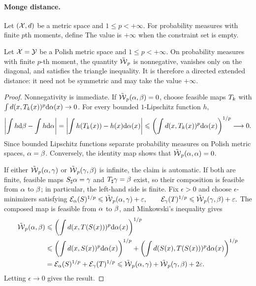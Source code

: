 \paragraph{Monge distance.}
\begin{defn}\label{def-directed-monge-distance}
Let $(\mathcal{X},d)$ be a metric space and $1\leq p<+\infty$. For probability measures with finite $p$th moments, define
The value is $+\infty$ when the constraint set is empty.
\end{defn}
\begin{prop}\label{prop-directed-monge-distance}
Let $\mathcal{X}=\mathcal{Y}$ be a Polish metric space and $1\leq p<+\infty$. On probability measures with finite $p$-th moment, the quantity $\tilde{\operatorname{\mathcal{W}}}_p$ is nonnegative, vanishes only on the diagonal, and satisfies the triangle inequality. It is therefore a directed extended distance: it need not be symmetric and may take the value $+\infty$.
\end{prop}
\begin{proof}
Nonnegativity is immediate. If $\tilde{\operatorname{\mathcal{W}}}_p(\alpha,\beta)=0$, choose feasible maps $T_k$ with $\int d(x,T_k(x))^p\mathrm{d}\alpha(x)\to0$. For every bounded $1$-Lipschitz function $h$,
\[
\left|\int h\mathrm{d}\beta-\int h\mathrm{d}\alpha\right|
=
\left|\int h(T_k(x))-h(x)\mathrm{d}\alpha(x)\right|
\leqslant
\left(\int d(x,T_k(x))^p\mathrm{d}\alpha(x)\right)^{1/p}
\longrightarrow0.
\]
Since bounded Lipschitz functions separate probability measures on Polish metric spaces, $\alpha=\beta$. Conversely, the identity map shows that $\tilde{\operatorname{\mathcal{W}}}_p(\alpha,\alpha)=0$.

If either $\tilde{\operatorname{\mathcal{W}}}_p(\alpha,\gamma)$ or $\tilde{\operatorname{\mathcal{W}}}_p(\gamma,\beta)$ is infinite, the claim is automatic. If both are finite, feasible maps $S_\sharp\alpha=\gamma$ and $T_\sharp\gamma=\beta$ exist, so their composition is feasible from $\alpha$ to $\beta$; in particular, the left-hand side is finite. Fix $\epsilon>0$ and choose $\epsilon$-minimizers satisfying
\(\mathcal{E}_\alpha(S)^{1/p}\leqslant\tilde{\operatorname{\mathcal{W}}}_p(\alpha,\gamma)+\varepsilon, \qquad \mathcal{E}_\gamma(T)^{1/p}\leqslant\tilde{\operatorname{\mathcal{W}}}_p(\gamma,\beta)+\varepsilon.\)
The composed map is feasible from $\alpha$ to $\beta$, and Minkowski's inequality gives
\[
\begin{aligned}
\tilde{\operatorname{\mathcal{W}}}_p(\alpha,\beta)
&\leqslant
\left(\int d(x,T(S(x)))^p\mathrm{d}\alpha(x)\right)^{1/p} \\
&\leqslant
\left(\int d(x,S(x))^p\mathrm{d}\alpha(x)\right)^{1/p}
+
\left(\int d(S(x),T(S(x)))^p\mathrm{d}\alpha(x)\right)^{1/p} \\
&=
\mathcal{E}_\alpha(S)^{1/p}+\mathcal{E}_\gamma(T)^{1/p}
\leqslant
\tilde{\operatorname{\mathcal{W}}}_p(\alpha,\gamma)+\tilde{\operatorname{\mathcal{W}}}_p(\gamma,\beta)+2\varepsilon.
\end{aligned}
\]
Letting $\epsilon\to0$ gives the result.
\end{proof}
